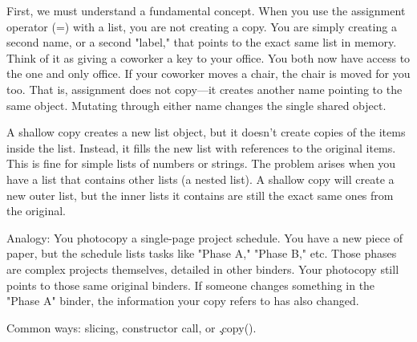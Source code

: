 First, we must understand a fundamental concept. When you use the assignment operator (=) with a list, you are not creating a copy. You are simply creating a second name, or a second "label," that points to the exact same list in memory. Think of it as giving a coworker a key to your office. You both now have access to the one and only office. If your coworker moves a chair, the chair is moved for you too. That is, assignment does not copy—it creates another name pointing to the same object. Mutating
through either name changes the single shared object.



A shallow copy creates a new list object, but it doesn't create copies of the items inside the list. Instead, it fills the new list with references to the original items. This is fine for simple lists of numbers or strings. The problem arises when you have a list that contains other lists (a nested list). A shallow copy will create a new outer list, but the inner lists it contains are still the exact same ones from the original.\par
Analogy: You photocopy a single-page project schedule. You have a new piece of paper, but the schedule lists tasks like "Phase A," "Phase B," etc. Those phases are complex projects themselves, detailed in other binders. Your photocopy still points to those same original binders. If someone changes something in the "Phase A" binder, the information your copy refers to has also changed.\par
Common ways: slicing, constructor call, or \c{.copy()}.

